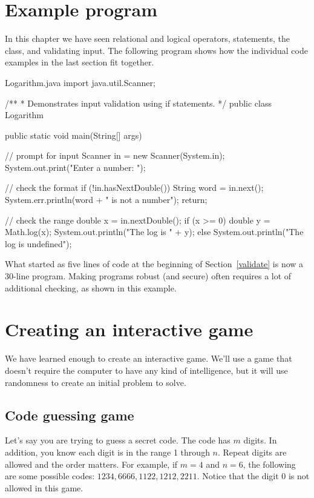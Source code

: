 \section{Example program}

In this chapter we have seen relational and logical operators,  statements, the  class, and validating input.
The following program shows how the individual code examples in the last section fit together.


\begin{trinket}{Logarithm.java}
	import java.util.Scanner;
	
	/**
	* Demonstrates input validation using if statements.
	*/
	public class Logarithm {
		
		public static void main(String[] args) {
			
			// prompt for input
			Scanner in = new Scanner(System.in);
			System.out.print("Enter a number: ");
			
			// check the format
			if (!in.hasNextDouble()) {
				String word = in.next();
				System.err.println(word + " is not a number");
				return;
			}
			
			// check the range
			double x = in.nextDouble();
			if (x >= 0) {
				double y = Math.log(x);
				System.out.println("The log is " + y);
			} else {
				System.out.println("The log is undefined");
			}
		}
	}
\end{trinket}

What started as five lines of code at the beginning of Section~\ref{validate} is now a 30-line program.
Making programs robust (and secure) often requires a lot of additional checking, as shown in this example.

\section{Creating an interactive game}

We have learned enough to create an interactive game. We'll use a game that doesn't require the computer to have any kind of intelligence, but it will use randomness to create an initial problem to solve.

\subsection{Code guessing game}
\label{guesscode}
Let's say you are trying to guess a secret code. The code has $m$ digits. In addition, you know each digit is in the range 1 through $n$. Repeat digits are allowed and the order matters. For example, if $m=4$ and $n=6$, the following are some possible codes: $1234,6666,1122,1212,2211$. Notice that the digit 0 is not allowed in this game.

